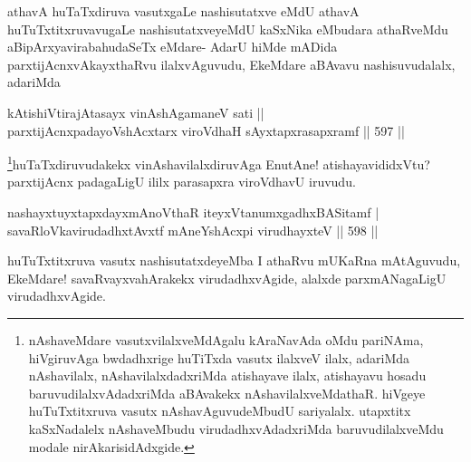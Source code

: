 \begin{artha}
athavA huTaTxdiruva vasutxgaLe nashisutatxve eMdU athavA huTuTxtitxruvavugaLe nashisutatxveyeMdU kaSxNika eMbudara athaRveMdu aBipArxyavirabahudaSeTx eMdare- AdarU hiMde mADida parxtijAcnxvAkayxthaRvu ilalxvAguvudu, EkeMdare aBAvavu nashisuvudalalx, adariMda
\end{artha}


\begin{shl}
kA\s tishiVtirajAtasayx vinAshAgamaneV sati ||  \\
parxtijAcnxpadayoVshAcxtarx viroVdhaH sAyxtapxrasapxramf \hfill||  597 ||  
\end{shl}

\begin{artha}
\footnote{nAshaveMdare vasutxvilalxveMdAgalu kAraNavAda oMdu pariNAma, hiVgiruvAga bwdadhxrige huTiTxda vasutx ilalxveV ilalx, adariMda nAshavilalx, nAshavilalxdadxriMda atishayave ilalx, atishayavu hosadu baruvudilalxvAdadxriMda aBAvakekx nAshavilalxveMdathaR. hiVgeye huTuTxtitxruva vasutx nAshavAguvudeMbudU sariyalalx. utapxtitx kaSxNadalelx nAshaveMbudu virudadhxvAdadxriMda baruvudilalxveMdu modale nirAkarisidAdxgide.}huTaTxdiruvudakekx vinAshavilalxdiruvAga EnutAne! atishayavididxVtu? parxtijAcnx padagaLigU ililx parasapxra viroVdhavU iruvudu.
\end{artha}


\begin{shl}
\footnotemark[2]nashayxtuyxtapxdayxmAnoV\s thaR iteyxVtanumxgadhxBASitamf | \\
savaRloVkavirudadhxtAvxtf \footnotemark[3]mAneYshAcxpi virudhayxteV \hfill||  598 ||  
\end{shl}

\begin{artha}
huTuTxtitxruva vasutx nashisutatxdeyeMba I athaRvu mUKaRna mAtAguvudu, EkeMdare! savaRvayxvahArakekx virudadhxvAgide, alalxde parxmANagaLigU virudadhxvAgide.
\end{artha}

